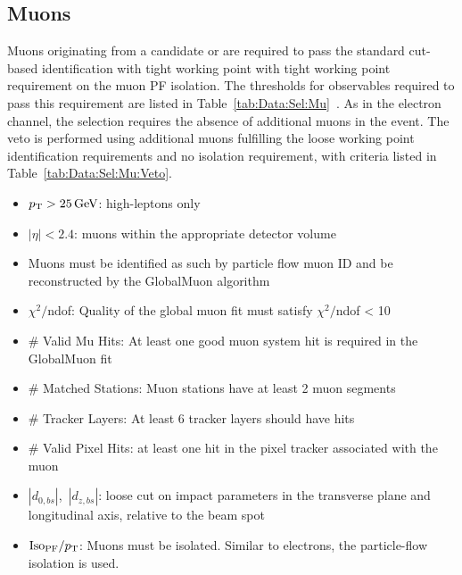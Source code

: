 \subsection{Muons}\label{ch:IdIso:Mu}
Muons originating from a candidate \Wpm or \Z are required to pass the standard cut-based identification with tight working point with tight working point requirement on the muon PF isolation. The thresholds for observables required to pass this requirement are listed in Table~\ref{tab:Data:Sel:Mu}~\cite{MuonIDIsoCuts}. As in the electron channel, the \Wpm selection requires the absence of additional muons in the event. The veto is performed using additional muons fulfilling the loose working point identification requirements and no isolation requirement, with criteria listed in Table~\ref{tab:Data:Sel:Mu:Veto}.
\begin{itemize}
    \item $p_{\mathrm{T}} > 25 \,\text{Ge\hspace{-.08em}V}$: high-\pt leptons only
    \item $|\eta| < 2.4$: muons within the appropriate detector volume
    \item Muons must be identified as such by particle flow muon ID and be reconstructed by the GlobalMuon algorithm
    \item $\chi^2/$ndof: Quality of the global muon fit must satisfy $\chi^2/$ndof < 10
    \item \# Valid Mu Hits: At least one good muon system hit is required in the GlobalMuon fit
    \item \# Matched Stations: Muon stations have at least 2 muon segments
    \item \# Tracker Layers: At least 6 tracker layers should have hits
    \item \# Valid Pixel Hits: at least one hit in the pixel tracker associated with the muon
    \item $|d_{0,bs}|$,~$|d_{z,bs}|$: loose cut on impact parameters in the transverse plane and longitudinal axis, relative to the beam spot 
    \item $\mathrm{Iso_{PF}}/p_{\mathrm{T}}$: Muons must be isolated. Similar to electrons, the particle-flow isolation is used. 
\end{itemize}





